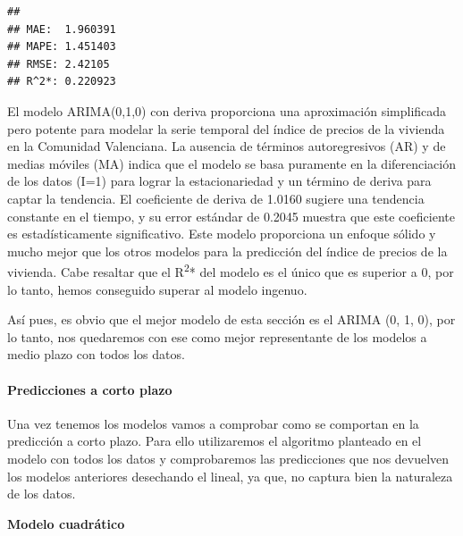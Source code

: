 \documentclass[
]{article}
\begin{document}
\begin{verbatim}
## 
## MAE:  1.960391 
## MAPE: 1.451403 
## RMSE: 2.42105 
## R^2*: 0.220923
\end{verbatim}

El modelo ARIMA(0,1,0) con deriva proporciona una aproximación
simplificada pero potente para modelar la serie temporal del índice de
precios de la vivienda en la Comunidad Valenciana. La ausencia de
términos autoregresivos (AR) y de medias móviles (MA) indica que el
modelo se basa puramente en la diferenciación de los datos (I=1) para
lograr la estacionariedad y un término de deriva para captar la
tendencia. El coeficiente de deriva de 1.0160 sugiere una tendencia
constante en el tiempo, y su error estándar de 0.2045 muestra que este
coeficiente es estadísticamente significativo. Este modelo proporciona
un enfoque sólido y mucho mejor que los otros modelos para la predicción
del índice de precios de la vivienda. Cabe resaltar que el
R\textsuperscript{2}* del modelo es el único que es superior a 0, por lo
tanto, hemos conseguido superar al modelo ingenuo.

Así pues, es obvio que el mejor modelo de esta sección es el ARIMA (0,
1, 0), por lo tanto, nos quedaremos con ese como mejor representante de
los modelos a medio plazo con todos los datos.

\hypertarget{predicciones-a-corto-plazo}{%
\paragraph{Predicciones a corto
plazo}\label{predicciones-a-corto-plazo}}

Una vez tenemos los modelos vamos a comprobar como se comportan en la
predicción a corto plazo. Para ello utilizaremos el algoritmo planteado
en el modelo con todos los datos y comprobaremos las predicciones que
nos devuelven los modelos anteriores desechando el lineal, ya que, no
captura bien la naturaleza de los datos.

\textbf{Modelo cuadrático}
\end{document}
